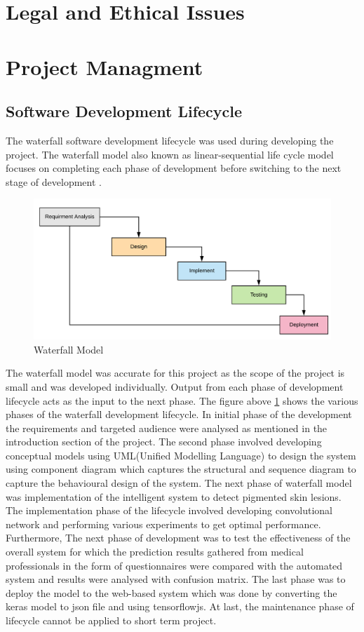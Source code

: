 \section{Legal and Ethical Issues}

\pagebreak

\section{Project Managment}

\subsection{Software Development Lifecycle}
The waterfall software development lifecycle was used during developing the project. The waterfall
model also known as linear-sequential life cycle model focuses on completing each phase of
development before switching to the next stage of development \citep{sdlc}. 
\begin{figure}[!htp]
    \centering
    \includegraphics[width=.8\textwidth]{Images/waterfall}
    \caption{Waterfall Model}
    \label{fig:waterfall}
\end{figure}
The waterfall model was accurate for this project as the scope of the project is small and was developed individually. Output
from each phase of development lifecycle acts as the input to the next phase. The figure above
\ref{fig:waterfall} shows the various phases of the waterfall development lifecycle. In initial phase of the
development the requirements and targeted audience were analysed as mentioned in the
introduction section of the project. The second phase involved developing conceptual models using
UML(Unified Modelling Language) to design the system using component diagram which captures
the structural and sequence diagram to capture the behavioural design of the system. The next
phase of waterfall model was implementation of the intelligent system to detect pigmented skin
lesions. The implementation phase of the lifecycle involved developing convolutional network and
performing various experiments to get optimal performance. Furthermore, The next phase of
development was to test the effectiveness of the overall system for which the prediction results
gathered from medical professionals in the form of questionnaires were compared with the
automated system and results were analysed with confusion matrix. The last phase was to deploy
the model to the web-based system which was done by converting the keras model to json file and
using tensorflowjs. At last, the maintenance phase of lifecycle cannot be applied to short term
project.

